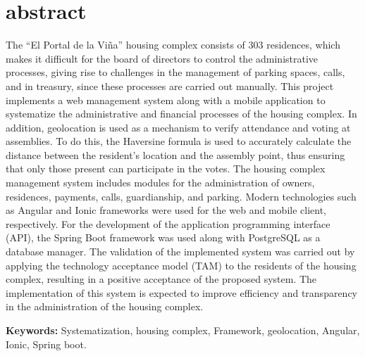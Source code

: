 \newpage
\chapter*{abstract}

The {\textquotedblleft}El Portal de la Viña{\textquotedblright} housing complex consists of 303 residences, which makes it difficult for the board of directors to control the administrative processes, giving rise to challenges in the management of parking spaces, calls, and in treasury, since these processes are carried out manually.
\bigbreak
This project implements a web management system along with a mobile application to systematize the administrative and financial processes of the housing complex. In addition, geolocation is used as a mechanism to verify attendance and voting at assemblies. To do this, the Haversine formula is used to accurately calculate the distance between the resident's location and the assembly point, thus ensuring that only those present can participate in the votes.
\bigbreak
The housing complex management system includes modules for the administration of owners, residences, payments, calls, guardianship, and parking. Modern technologies such as Angular and Ionic frameworks were used for the web and mobile client, respectively. For the development of the application programming interface (API), the Spring Boot framework was used along with PostgreSQL as a database manager.
\bigbreak
The validation of the implemented system was carried out by applying the technology acceptance model (TAM) to the residents of the housing complex, resulting in a positive acceptance of the proposed system. The implementation of this system is expected to improve efficiency and transparency in the administration of the housing complex.

\vfill
\textbf{Keywords:} Systematization, housing complex, Framework, geolocation, Angular, Ionic, Spring boot.
